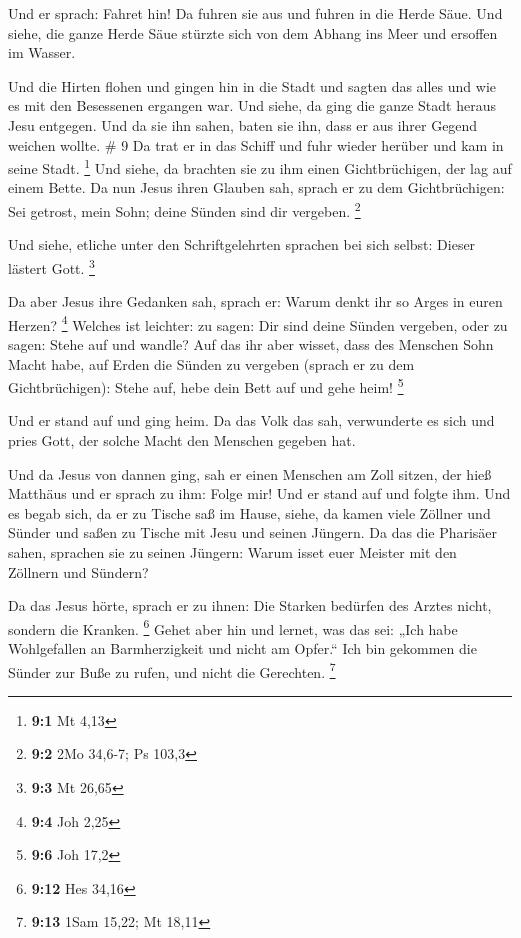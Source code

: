  Und er sprach: Fahret hin! Da fuhren sie aus und fuhren
in die Herde Säue. Und siehe, die ganze Herde Säue stürzte sich von dem
Abhang ins Meer und ersoffen im Wasser.

 Und die Hirten flohen und gingen hin in die Stadt und
sagten das alles und wie es mit den Besessenen ergangen war.
 Und siehe, da ging die ganze Stadt heraus Jesu entgegen.
Und da sie ihn sahen, baten sie ihn, dass er aus ihrer Gegend weichen
wollte. \# 9  Da trat er in das Schiff und fuhr wieder
herüber und kam in seine Stadt. \footnote{\textbf{9:1} Mt 4,13}
 Und siehe, da brachten sie zu ihm einen Gichtbrüchigen,
der lag auf einem Bette. Da nun Jesus ihren Glauben sah, sprach er zu
dem Gichtbrüchigen: Sei getrost, mein Sohn; deine Sünden sind dir
vergeben. \footnote{\textbf{9:2} 2Mo 34,6-7; Ps 103,3}

 Und siehe, etliche unter den Schriftgelehrten sprachen
bei sich selbst: Dieser lästert Gott. \footnote{\textbf{9:3} Mt 26,65}

 Da aber Jesus ihre Gedanken sah, sprach er: Warum denkt
ihr so Arges in euren Herzen? \footnote{\textbf{9:4} Joh 2,25}
 Welches ist leichter: zu sagen: Dir sind deine Sünden
vergeben, oder zu sagen: Stehe auf und wandle?  Auf das
ihr aber wisset, dass des Menschen Sohn Macht habe, auf Erden die Sünden
zu vergeben (sprach er zu dem Gichtbrüchigen): Stehe auf, hebe dein Bett
auf und gehe heim! \footnote{\textbf{9:6} Joh 17,2}

 Und er stand auf und ging heim.  Da das
Volk das sah, verwunderte es sich und pries Gott, der solche Macht den
Menschen gegeben hat.

 Und da Jesus von dannen ging, sah er einen Menschen am
Zoll sitzen, der hieß Matthäus und er sprach zu ihm: Folge mir! Und er
stand auf und folgte ihm.  Und es begab sich, da er zu
Tische saß im Hause, siehe, da kamen viele Zöllner und Sünder und saßen
zu Tische mit Jesu und seinen Jüngern.  Da das die
Pharisäer sahen, sprachen sie zu seinen Jüngern: Warum isset euer
Meister mit den Zöllnern und Sündern?

 Da das Jesus hörte, sprach er zu ihnen: Die Starken
bedürfen des Arztes nicht, sondern die Kranken. \footnote{\textbf{9:12}
  Hes 34,16}  Gehet aber hin und lernet, was das sei:
„Ich habe Wohlgefallen an Barmherzigkeit und nicht am Opfer.`` Ich bin
gekommen die Sünder zur Buße zu rufen, und nicht die Gerechten.
\footnote{\textbf{9:13} 1Sam 15,22; Mt 18,11}

